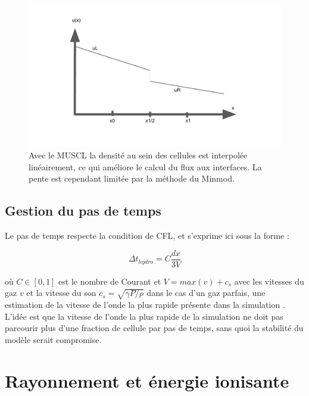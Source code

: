 \begin{figure}
        \includegraphics[width=.95\linewidth]{img/02/MUSCL_minmod.pdf} 
        \caption[Méthode MUSCL]{Avec le \ac{MUSCL} la densité au sein des cellules est interpolée linéairement, ce qui améliore le calcul du flux aux interfaces.
        La pente est cependant limitée par la méthode du Minmod.
 		\label{fig:MUSCL}
 		}
\end{figure}



\subsection{Gestion du pas de temps}
\label{sec:dthydro}

Le pas de temps respecte la condition de \ac{CFL}, et s'exprime ici sous la forme :

\begin{equation}
\Delta t_{hydro} = C \frac{dx}{3V}
\end{equation}

où $C \in [0,1] $ est le nombre de Courant et $V = max(v) + c_s$ avec les vitesses du gaz $v$ et la vitesse du son $c_s = \sqrt{\gamma P/\rho}$ dans le cas d'un gaz parfais, une estimation de la vitesse de l'onde la plus rapide présente dans la simulation \citep{toro1999riemann}.
L'idée est que la vitesse de l'onde la plus rapide de la simulation ne doit pas parcourir plus d'une fraction de cellule par pas de temps, sans quoi la stabilité du modèle serait compromise.


\section{Rayonnement et énergie ionisante}
\label{sec:rad_solver}

